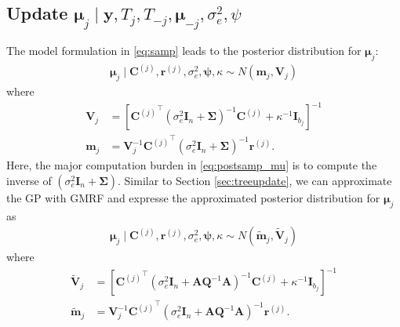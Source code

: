 \documentclass{article}
\begin{document}
{\subsection{Update \texorpdfstring{$\boldsymbol{\mu}_j \mid \boldsymbol{y}, T_{j}, T_{-j}, \boldsymbol{\mu}_{-j}, \sigma_e^2, \psi$}{u2}}
The model formulation in \eqref{eq:samp} leads to the posterior distribution for $\boldsymbol{\mu}_j$: 
\begin{align*}
	\boldsymbol{\mu}_j \mid {\mathbf{C}^{(j)}}, \boldsymbol{r}^{(j)}, \sigma_e^2, \boldsymbol{\psi}, \kappa \sim N(\boldsymbol{m}_j, \mathbf{V}_j)
\end{align*}
where 
\begin{equation}
\begin{aligned}
\label{eq:postsamp_mu}
	\mathbf{V}_j &= \left[{\mathbf{C}^{(j)}}^\intercal \left(\sigma_e^2 \mathbf{I}_n + \mathbf{\Sigma}\right)^{-1}{\mathbf{C}^{(j)}} + \kappa^{-1}\mathbf{I}_{b_j}\right]^{-1} \\ \boldsymbol{m}_j &= \mathbf{V}_j^{-1} {\mathbf{C}^{(j)}}^\intercal \left(\sigma_e^2 \mathbf{I}_n + \mathbf{\Sigma}\right)^{-1} \boldsymbol{r}^{(j)}.
\end{aligned}
\end{equation}
Here, the major computation burden in \eqref{eq:postsamp_mu} is to compute the inverse of $\left(\sigma_e^2 \mathbf{I}_n + \mathbf{\Sigma}\right)$. Similar to Section \ref{sec:treeupdate}, we can approximate the GP with GMRF and expresse the approximated posterior distribution for $\boldsymbol{\mu}_j$ as
\begin{align*}
	\boldsymbol{\mu}_j \mid {\mathbf{C}^{(j)}}, \boldsymbol{r}^{(j)}, \sigma_e^2, \boldsymbol{\psi}, \kappa \sim N(\tilde{\boldsymbol{m}}_j, \tilde{\mathbf{V}}_j)
\end{align*}
where 
\begin{equation} 
\begin{aligned}
\label{eq:postsamp_mu_approx}
	\tilde{\mathbf{V}}_j &= \left[{\mathbf{C}^{(j)}}^\intercal \left(\sigma_e^2 \mathbf{I}_n + \mathbf{AQ}^{-1}\mathbf{A}\right)^{-1}{\mathbf{C}^{(j)}} + \kappa^{-1}\mathbf{I}_{b_j}\right]^{-1} \\ \tilde{\boldsymbol{m}}_j &= \mathbf{V}_j^{-1} {\mathbf{C}^{(j)}}^\intercal \left(\sigma_e^2 \mathbf{I}_n + \mathbf{AQ}^{-1}\mathbf{A}\right)^{-1} \boldsymbol{r}^{(j)}.

\end{aligned}
\end{equation}}
\end{document}
